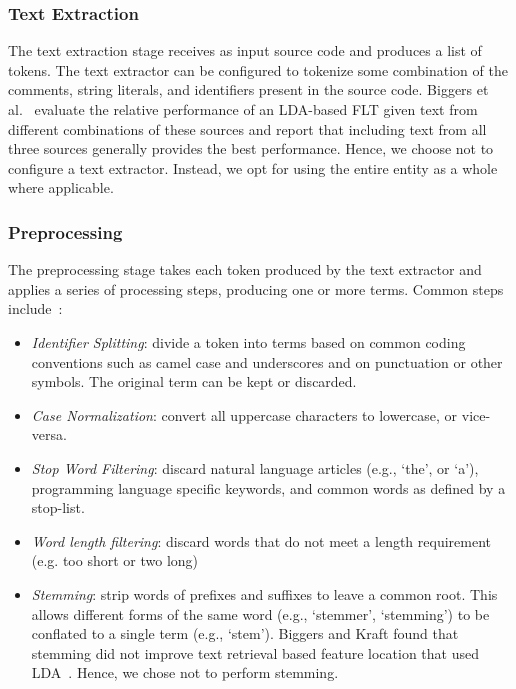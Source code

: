     \subsubsection{Text Extraction}
    The text extraction stage receives as input source code and produces a list of tokens.
    The text extractor can be configured to tokenize some combination of
    the comments, string literals, and identifiers present in the source code.
    Biggers et al.~\cite{Biggers-etal:2011} evaluate the relative performance of an LDA-based FLT
    given text from different combinations of these sources
    and report that including text from all three sources generally provides the best performance.
    Hence, we choose not to configure a text extractor.
    Instead, we opt for using the entire entity as a whole where applicable.

    \subsubsection{Preprocessing}
    The preprocessing stage takes each token produced by the text extractor
    and applies a series of processing steps, producing one or more terms.
    Common steps include~\cite{Marcus-etal:2004, Marcus-Menzies:2010}:
    \begin{itemize}
    \setlength{\itemsep}{1pt}
    \item \textit{Identifier Splitting}:
    divide a token into terms based on common coding conventions
    such as camel case and underscores and on punctuation or other symbols.
    The original term can be kept or discarded.
    \item \textit{Case Normalization}:
    convert all uppercase characters to lowercase, or vice-versa.
    \item \textit{Stop Word Filtering}:
    discard natural language articles (e.g., ‘the’, or ‘a’),
    programming language specific keywords,
    and common words as defined by a stop-list.
    \item \textit{Word length filtering}:
    discard words that do not meet a length requirement (e.g. too short or two long)
    \item \textit{Stemming}:
    strip words of prefixes and suffixes to leave a common root.
    This allows different forms of the same word
    (e.g., ‘stemmer’, ‘stemming’)
    to be conflated to a single term
    (e.g., ‘stem’).
    Biggers and Kraft found that stemming did not improve text retrieval based feature location that used LDA~\cite{Biggers-Kraft:2012}.
    Hence, we chose not to perform stemming.
    \end{itemize}

